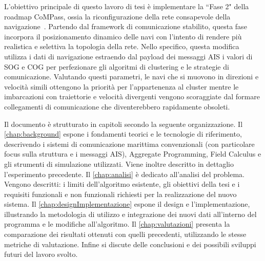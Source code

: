 L'obiettivo principale di questo lavoro di tesi è implementare la ``Fase 2" della roadmap CoMPass, ossia la riconfigurazione della rete consapevole della navigazione~\cite{roadmap}. Partendo dal framework di comunicazione stabilito, questa fase incorpora il posizionamento dinamico delle navi con l'intento di rendere più realistica e selettiva la topologia della rete. Nello specifico, questa modifica utilizza i dati di navigazione estraendo dal payload dei messaggi \ac{AIS} i valori di \ac{SOG} e \ac{COG} per perfezionare gli algoritmi di clustering e le strategie di comunicazione. Valutando questi parametri, le navi che si muovono in direzioni e velocità simili ottengono la priorità per l'appartenenza al cluster mentre le imbarcazioni con traiettorie e velocità divergenti vengono scoraggiate dal formare collegamenti di comunicazione che diventerebbero rapidamente obsoleti.

Il documento è strutturato in capitoli secondo la seguente organizzazione. Il \cref{chap:background} espone i fondamenti teorici e le tecnologie di riferimento, descrivendo i sistemi di comunicazione marittima convenzionali (con particolare focus sulla struttura e i messaggi \ac{AIS}), Aggregate Programming, Field Calculus e gli strumenti di simulazione utilizzati. Viene inoltre descritto in dettaglio l'esperimento precedente. Il \cref{chap:analisi} è dedicato all'analisi del problema. Vengono descritti: i limiti dell'algoritmo esistente, gli obiettivi della tesi e i requisiti funzionali e non funzionali richiesti per la realizzazione del nuovo sistema. Il \cref{chap:designImplementazione} espone il design e l'implementazione, illustrando la metodologia di utilizzo e integrazione dei nuovi dati all'interno del programma e le modifiche all'algoritmo. Il \cref{chap:valutazioni} presenta la comparazione dei risultati ottenuti con quelli precedenti, utilizzando le stesse metriche di valutazione. Infine si discute delle conclusioni e dei possibili sviluppi futuri del lavoro svolto.
